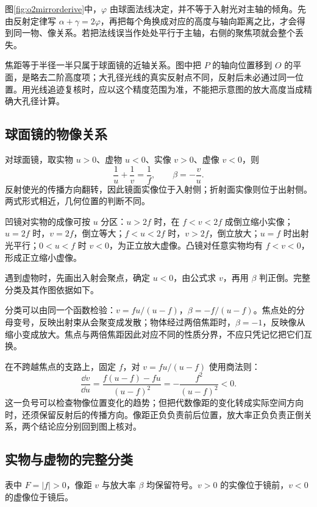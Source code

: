 图\ref{fig:o2mirrorderive}中，$\varphi$ 由球面法线决定，并不等于入射光对主轴的倾角。先由反射定律写 $\alpha+\gamma=2\varphi$，再把每个角换成对应的高度与轴向距离之比，才会得到同一物、像关系。若把法线误当作处处平行于主轴，右侧的聚焦项就会整个丢失。

焦距等于半径一半只属于球面镜的近轴关系。图中把 $P$ 的轴向位置移到 $O$ 的平面，是略去二阶高度项；大孔径光线的真实反射点不同，反射后未必通过同一位置。用光线追迹复核时，应以这个精度范围为准，不能把示意图的放大高度当成精确大孔径计算。

\subsection{球面镜的物像关系}

对球面镜，取实物 \(u>0\)、虚物 \(u<0\)、实像 \(v>0\)、虚像 \(v<0\)，则
\[
 \boxed{\frac1u+\frac1v=\frac1f},\qquad
 \boxed{\beta=-\frac vu}.
\]
反射使光的传播方向翻转，因此镜面实像位于入射侧；折射面实像则位于出射侧。两式形式相近，几何位置的判断不同。

凹镜对实物的成像可按 \(u\) 分区：\(u>2f\) 时，在 \(f<v<2f\) 成倒立缩小实像；\(u=2f\) 时，\(v=2f\)，倒立等大；\(f<u<2f\) 时，\(v>2f\)，倒立放大；\(u=f\) 时出射光平行；\(0<u<f\) 时 \(v<0\)，为正立放大虚像。凸镜对任意实物均有 \(f<v<0\)，形成正立缩小虚像。

遇到虚物时，先画出入射会聚点，确定 \(u<0\)，由公式求 \(v\)，再用 \(\beta\) 判正倒。完整分类及其作图依据如下。

分类可以由同一个函数检验：$v=fu/(u-f)$，$\beta=-f/(u-f)$。焦点处的分母变号，反映出射束从会聚变成发散；物体经过两倍焦距时，$\beta=-1$，反映像从缩小变成放大。焦点与两倍焦距因此对应不同的性质分界，不应只凭记忆把它们互换。

在不跨越焦点的支路上，固定 $f$，对 $v=fu/(u-f)$ 使用商法则：
\[
\frac{\dd v}{\dd u}
=\frac{f(u-f)-fu}{(u-f)^2}
=-\frac{f^2}{(u-f)^2}<0.
\]
这一负号可以检查物像位置变化的趋势；但把代数像距的变化转成实际空间方向时，还须保留反射后的传播方向。像距正负负责前后位置，放大率正负负责正倒关系，两个结论应分别回到图上核对。

\subsection{实物与虚物的完整分类}

表中 \(F=|f|>0\)，像距 \(v\) 与放大率 \(\beta\) 均保留符号。\(v>0\) 的实像位于镜前，\(v<0\) 的虚像位于镜后。

